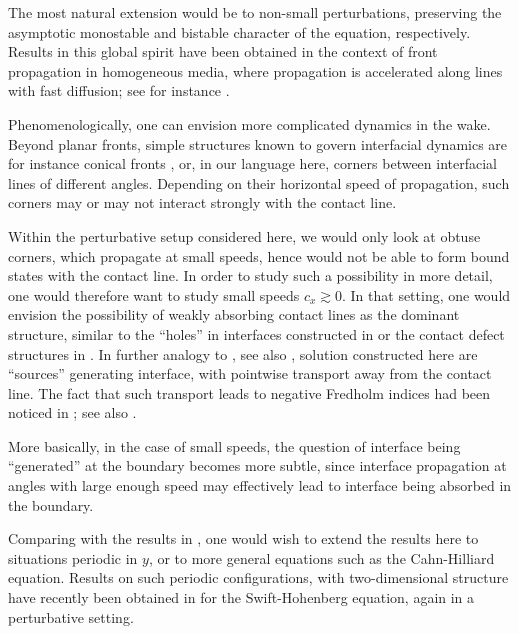 \documentclass[10pt]{article}
\begin{document}
The most natural extension would be to non-small perturbations, preserving the asymptotic monostable and bistable character of the equation, respectively. Results in this global spirit have been obtained in the context of front propagation in homogeneous media, where propagation is accelerated along lines with fast diffusion; see for instance \cite{pauthier}.

Phenomenologically, one can envision more complicated dynamics in the wake. Beyond planar fronts, simple structures known to govern interfacial dynamics are for instance conical fronts \cite{hamel,Haragus_Scheel_corner,Haragus_Scheel_review}, or, in our language here, corners between interfacial lines of different angles. Depending on their horizontal speed of propagation, such corners may or may not interact strongly with the contact line. 

Within the perturbative setup considered here, we would only look at obtuse corners, which propagate at small speeds, hence would not be able to form bound states with the contact line. In order to study such a possibility in more detail, one would therefore want to study small speeds $c_x\gtrsim 0$. In that setting, one would envision the possibility of weakly absorbing contact lines as the dominant structure, similar to the ``holes'' in interfaces constructed in \cite{Haragus_Scheel_corner} or the contact defect structures in \cite{kollar}. In further analogy to \cite{kollar}, see also \cite{ssdefect}, solution constructed here are ``sources'' generating interface, with pointwise transport away from the contact line. The fact that such transport leads to negative Fredholm indices had been noticed in \cite{ssdefect}; see also \cite{ssmorse}.

More basically, in the case of small speeds, the question of interface being ``generated'' at the boundary becomes more subtle, since interface propagation at angles with large enough speed  may effectively lead to interface being absorbed in the boundary. 

Comparing with the results in \cite{Monteiro_Scheel}, one would wish to extend the results here to situations periodic in $y$, or to more general equations such as the Cahn-Hilliard equation. Results on such periodic configurations, with two-dimensional structure have recently been obtained in \cite{gohscheel} for the Swift-Hohenberg equation, again in a perturbative setting. 


\small
\end{document}
